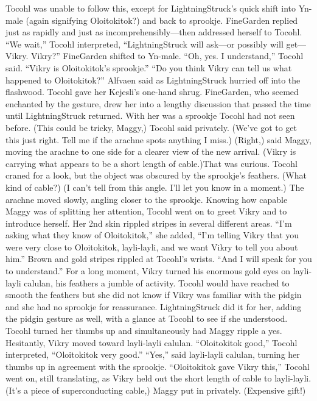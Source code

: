 \documentclass[9pt]{article}
\begin{document}
Tocohl was unable to follow this, except for LightningStruck’s quick shift into Yn-male (again
signifying Oloitokitok?) and back to sprookje. FineGarden replied just as rapidly and just as
incomprehensibly—then addressed herself to Tocohl.
“We wait,” Tocohl interpreted, “LightningStruck will ask—or possibly will get—Vikry. Vikry?”
FineGarden shifted to Yn-male. “Oh, yes. I understand,” Tocohl said. “Vikry is Oloitokitok’s sprookje.”
“Do you think Vikry can tell us what happened to Oloitokitok?” Alfvaen said as LightningStruck
hurried off into the flashwood. Tocohl gave her Kejesli’s one-hand shrug. FineGarden, who seemed
enchanted by the gesture, drew her into a lengthy discussion that passed the time until LightningStruck
returned.
With her was a sprookje Tocohl had not seen before.
(This could be tricky, Maggy,) Tocohl said privately. (We’ve got to get this just right. Tell me if the
arachne spots anything I miss.)
(Right,) said Maggy, moving the arachne to one side for a clearer view of the new arrival. (Vikry is
carrying what appears to be a short length of cable.)That was curious. Tocohl craned for a look, but the object was obscured by the sprookje’s feathers.
(What kind of cable?)
(I can’t tell from this angle. I’ll let you know in a moment.) The arachne moved slowly, angling closer
to the sprookje.
Knowing how capable Maggy was of splitting her attention, Tocohl went on to greet Vikry and to
introduce herself. Her 2nd skin rippled stripes in several different areas.
“I’m asking what they know of Oloitokitok,” she added, “I’m telling Vikry that you were very close
to Oloitokitok, layli-layli, and we want Vikry to tell you about him.” Brown and gold stripes rippled at
Tocohl’s wrists. “And I will speak for you to understand.”
For a long moment, Vikry turned his enormous gold eyes on layli-layli calulan, his feathers a jumble
of activity.
Tocohl would have reached to smooth the feathers but she did not know if Vikry was familiar with
the pidgin and she had no sprookje for reassurance. LightningStruck did it for her, adding the pidgin
gesture as well, with a glance at Tocohl to see if she understood. Tocohl turned her thumbs up and
simultaneously had Maggy ripple a yes.
Hesitantly, Vikry moved toward layli-layli calulan. “Oloitokitok good,” Tocohl interpreted,
“Oloitokitok very good.”
“Yes,” said layli-layli calulan, turning her thumbs up in agreement with the sprookje.
“Oloitokitok gave Vikry this,” Tocohl went on, still translating, as Vikry held out the short length of
cable to layli-layli.
(It’s a piece of superconducting cable,) Maggy put in privately. (Expensive gift!)
\end{document}
